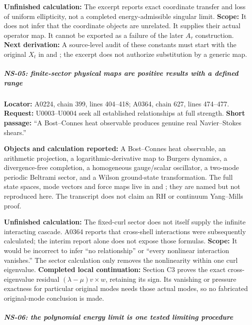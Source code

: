 \textbf{Unfinished calculation:} The excerpt reports exact coordinate
transfer and loss of uniform ellipticity, not a completed
energy-admissible singular limit. \textbf{Scope:} It does not infer that
the coordinate objects are unrelated. It supplies their actual operator
map. It cannot be exported as a failure of the later \(A_\tau\)
construction. \textbf{Next derivation:} A source-level audit of these
constants must start with the original \(X_t\) in
\protect{} and
\protect{}; the excerpt does not authorize
substitution by a generic map.

\subparagraph{NS-05: finite-sector physical maps are positive results
with a defined
range}\label{ns-05-finite-sector-physical-maps-are-positive-results-with-a-defined-range}

\textbf{Locator:} A0224, chain 399, lines 404--418; A0364, chain 627,
lines 474--477. \textbf{Request:} U0003--U0004 seek all established
relationships at full strength. \textbf{Short passage:} ``A Bost--Connes
heat observable produces genuine real Navier--Stokes shears.''

\textbf{Objects and calculation reported:} A Bost--Connes heat
observable, an arithmetic projection, a logarithmic-derivative map to
Burgers dynamics, a divergence-free completion, a homogeneous
gauge/scalar oscillator, a two-mode periodic Beltrami sector, and a
Wilson ground-state transformation. The full state spaces, mode vectors
and force maps live in \protect{} and
\protect{}; they are named but not reproduced
here. The transcript does not claim an RH or continuum Yang--Mills
proof.

\textbf{Unfinished calculation:} The fixed-curl sector does not itself
supply the infinite interacting cascade. A0364 reports that cross-shell
interactions were subsequently calculated; the interim report alone does
not expose those formulas. \textbf{Scope:} It would be incorrect to
infer ``no relationship'' or ``every nonlinear interaction vanishes.''
The sector calculation only removes the nonlinearity within one curl
eigenvalue. \textbf{Completed local continuation:} Section C3 proves the
exact cross-eigenvalue residual \((\lambda-\mu)v\times w\), retaining
its sign. Its vanishing or pressure exactness for particular original
modes needs those actual modes, so no fabricated original-mode
conclusion is made.

\subparagraph{NS-06: the polynomial energy limit is one tested limiting
procedure}\label{ns-06-the-polynomial-energy-limit-is-one-tested-limiting-procedure}

